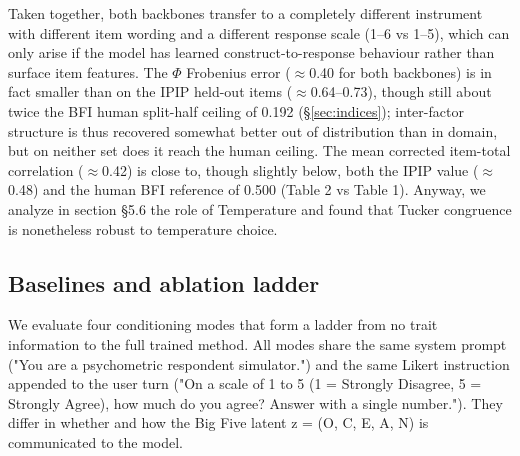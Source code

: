 \documentclass[11pt]{article}
\begin{document}
Taken together, both backbones transfer to a completely different instrument with different item wording and a different response scale (1–6 vs 1–5), which can only arise if the model has learned construct-to-response behaviour rather than surface item features. The $\Phi$ Frobenius error ($\approx$0.40 for both backbones) is in fact smaller than on the IPIP held-out items ($\approx$0.64--0.73), though still about twice the BFI human split-half ceiling of 0.192 (\S\ref{sec:indices}); inter-factor structure is thus recovered somewhat better out of distribution than in domain, but on neither set does it reach the human ceiling. The mean corrected item-total correlation ($\approx$0.42) is close to, though slightly below, both the IPIP value ($\approx$0.48) and the human BFI reference of 0.500 (Table 2 vs Table 1). Anyway, we analyze in section \S{}5.6 the role of Temperature and found that Tucker congruence is nonetheless robust to temperature choice.

\begin{table}[ht!]
\centering
\caption{Tucker congruence coefficients and related psychometric indices for the BFI out-of-distribution set (25 items, 5 per factor). Column definitions as in Table 1 (item-r human reference 0.500).}
\end{table}

\subsection{Baselines and ablation ladder}

We evaluate four conditioning modes that form a ladder from no trait information to the full trained method. All modes share the same system prompt ("You are a psychometric respondent simulator.") and the same Likert instruction appended to the user turn ("On a scale of 1 to 5 (1 = Strongly Disagree, 5 = Strongly Agree), how much do you agree? Answer with a single number."). They differ in whether and how the Big Five latent z = (O, C, E, A, N) is communicated to the model.
\end{document}
